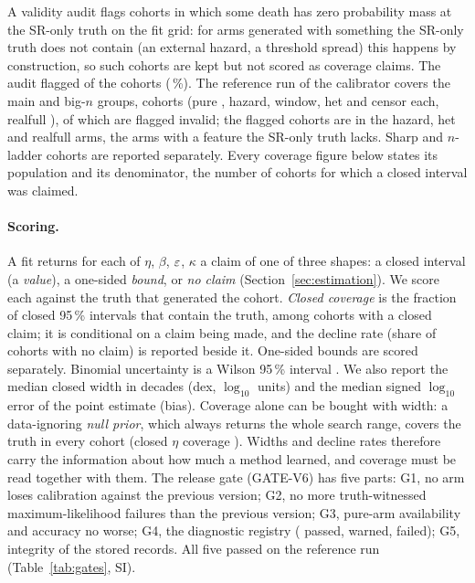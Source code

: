 A validity audit flags cohorts in which some death has zero probability mass at the SR-only truth on the fit grid:
for arms generated with something the SR-only truth does not contain (an external hazard, a threshold spread) this
happens by construction, so such cohorts are kept but not scored as coverage claims. The audit flagged  of the
 cohorts (\,\%). The reference run of the calibrator covers the main
and big-$n$ groups,  cohorts (pure , hazard, window, het and censor  each,
realfull ), of which  are flagged invalid; the flagged cohorts are in the hazard,
het and realfull arms, the arms with a feature the SR-only truth lacks. Sharp and $n$-ladder cohorts are reported separately. Every coverage figure below states its
population and its denominator, the number of cohorts for which a closed interval was claimed.

\paragraph{Scoring.} A fit returns for each of $\eta$, $\beta$, $\varepsilon$, $\kappa$ a claim of one of three shapes: a
closed interval (a \emph{value}), a one-sided \emph{bound}, or \emph{no claim} (Section~\ref{sec:estimation}). We
score each against the truth that generated the cohort. \emph{Closed coverage} is the fraction of closed 95\,\%
intervals that contain the truth, among cohorts with a closed claim; it is conditional on a claim being made, and the
decline rate (share of cohorts with no claim) is reported beside it. One-sided bounds are scored separately.
Binomial uncertainty is a Wilson 95\,\% interval \citep{wilson1927probable}. We also report the median closed width
in decades (dex, $\log_{10}$ units) and the median signed $\log_{10}$ error of the point estimate (bias). Coverage
alone can be bought with width: a data-ignoring \emph{null prior}, which always returns the whole search range,
covers the truth in every cohort (closed $\eta$ coverage ). Widths and decline rates therefore carry
the information about how much a method learned, and coverage must be read together with them. The release gate
(GATE-V6) has five parts: G1, no arm loses calibration against the previous version; G2, no more truth-witnessed
maximum-likelihood failures than the previous version; G3, pure-arm availability and accuracy no worse; G4, the
diagnostic registry ( passed,  warned,
 failed); G5, integrity of the stored records. All five passed on the reference run
(Table~\ref{tab:gates}, SI).

